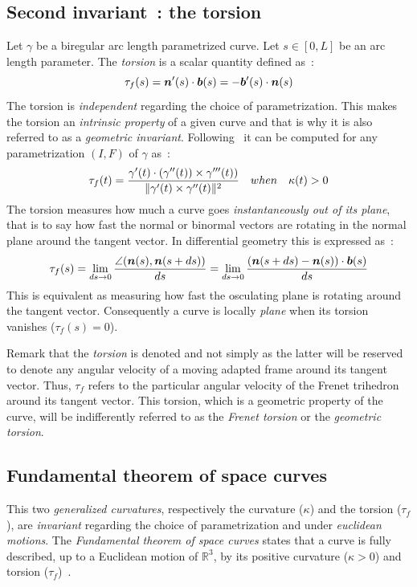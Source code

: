 \subsection{Second invariant~: the torsion}\label{sec:torsion}
Let $\gamma$ be a biregular arc length parametrized curve. Let $s \in [0,L]$ be an arc length parameter. The \emph{torsion} is a scalar quantity defined as~:
\begin{equation}
	\tau_f(s) = \boldsymbol{n}'(s) \cdot \boldsymbol{b}(s) = - \boldsymbol{b}'(s) \cdot \boldsymbol{n}(s)
\end{equation}
The torsion is \emph{independent} regarding the choice of parametrization. This makes the torsion an \emph{intrinsic property} of a given curve and that is why it is also referred to as a \emph{geometric invariant}. Following~\cite[p.204]{Gray2006} it can be computed for any parametrization $(I,F)$ of $\gamma$ as~:
\begin{equation}
	\tau_f(t) = \frac{\gamma'(t) \cdot (\gamma''(t)) \times \gamma'''(t))}{\lVert\gamma'(t) \times \gamma''(t)\rVert^2}
	\quad when \quad
	\kappa(t) > 0
\end{equation}
The torsion measures how much a curve goes \emph{instantaneously out of its plane}, that is to say how fast the normal or binormal vectors are rotating in the normal plane around the tangent vector. In differential geometry this is expressed as~:
\begin{equation}
	\tau_f(s) 
	= \lim_{ds \to 0}\frac{\angle(\boldsymbol{n}(s),\boldsymbol{n}(s+ds))}{ds}
	= \lim_{ds \to 0}\frac{(\boldsymbol{n}(s+ds) - \boldsymbol{n}(s)) \cdot \boldsymbol{b}(s)}{ds}
\end{equation}
This is equivalent as measuring how fast the osculating plane is rotating around the tangent vector. Consequently a curve is locally \emph{plane} when its torsion vanishes ($\tau_f(s) = 0$).

Remark that the \emph{torsion} is denoted  and not simply \textquote{$\tau$} as the latter will be reserved to denote any angular velocity of a moving adapted frame around its tangent vector. Thus, $\tau_f$ refers to the particular angular velocity of the Frenet trihedron around its tangent vector. This torsion, which is a geometric property of the curve, will be indifferently referred to as the \emph{Frenet torsion} or the \emph{geometric torsion}.

\subsection{Fundamental theorem of space curves}\label{sec:fundamental}
This two \emph{generalized curvatures}, respectively the curvature ($\kappa$) and the torsion ($\tau_f$), are \emph{invariant} regarding the choice of parametrization and under \emph{euclidean motions}. The \emph{Fundamental theorem of space curves} states that a curve is fully described, up to a Euclidean motion of ${\mathbb{R}}^3$, by its positive curvature ($\kappa > 0$) and torsion ($\tau_f$)~\cite[p.229]{Gray2006}.

